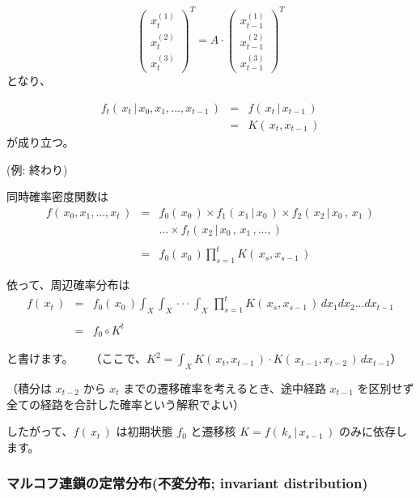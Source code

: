 \documentclass[
]{article}
\begin{document}
\[
\begin{pmatrix}
x^{(1)}_t \\
x^{(2)}_t \\
x^{(3)}_t
\end{pmatrix}^T
= A \cdot
\begin{pmatrix}
x^{(1)}_{t-1} \\
x^{(2)}_{t-1} \\
x^{(3)}_{t-1}
\end{pmatrix}^T
\] となり、

\[
\begin{eqnarray}
f_t(\,x_t\,|\,x_0,x_1,...,x_{t-1}\,) &=& f(\,x_t\,|\,x_{t-1}\,)\\
&=& K(\,x_t,x_{t-1}\,)
\end{eqnarray}
\] が成り立つ。

(例: 終わり)

同時確率密度関数は \[
\begin{eqnarray}
f(\,x_0,x_1,...,x_t\,) &=& f_0(\,x_0\,)  \times f_1(\,x_1\,|\,x_0\,) \times f_2(\,x_2\,|\,x_0\,,\,x_1\,)\\
&& ... \times f_t(\,x_2\,|\,x_0\,,\,x_1\,,...,)\\\\
&=&  f_0(\,x_0\,) \prod_{s=1}^{t}  K(\,x_s,x_{s-1}\,)
\end{eqnarray}
\]

依って、周辺確率分布は \[
\begin{eqnarray}
f(\,x_t\,) &=&  f_0(\,x_0\,) \int_{X}\int_{X} \cdot\cdot\cdot \int_{X} \,\prod_{s=1}^{t}  K(\,x_s,x_{s-1}\,)\, dx_1dx_2...dx_{t-1}\\
\\
&=& f_0 \circ  K^t
\end{eqnarray}
\]

と書けます。　 （ここで、\(K^2=\int_{X}K(\,x_t,x_{t-1}\,)\cdot K(\,x_{t-1},x_{t-2}\,)\,dx_{t-1}\)）

（積分は \(x_{t-2}\) から \(x_{t}\) までの遷移確率を考えるとき、途中経路
\(x_{t-1}\) を区別せず全ての経路を合計した確率という解釈でよい）

したがって、\(f(\,x_t\,)\) は初期状態 \(f_0\) と遷移核
\(K=f(\,k_s\,|\,x_{s-1}\,)\) のみに依存します。

\hypertarget{ux30deux30ebux30b3ux30d5ux9023ux9396ux306eux5b9aux5e38ux5206ux5e03ux4e0dux5909ux5206ux5e03-invariant-distribution}{%
\subsubsection{\texorpdfstring{\textbf{マルコフ連鎖の定常分布(不変分布;
invariant
distribution)}}{マルコフ連鎖の定常分布(不変分布; invariant distribution)}}\label{ux30deux30ebux30b3ux30d5ux9023ux9396ux306eux5b9aux5e38ux5206ux5e03ux4e0dux5909ux5206ux5e03-invariant-distribution}}
\end{document}

